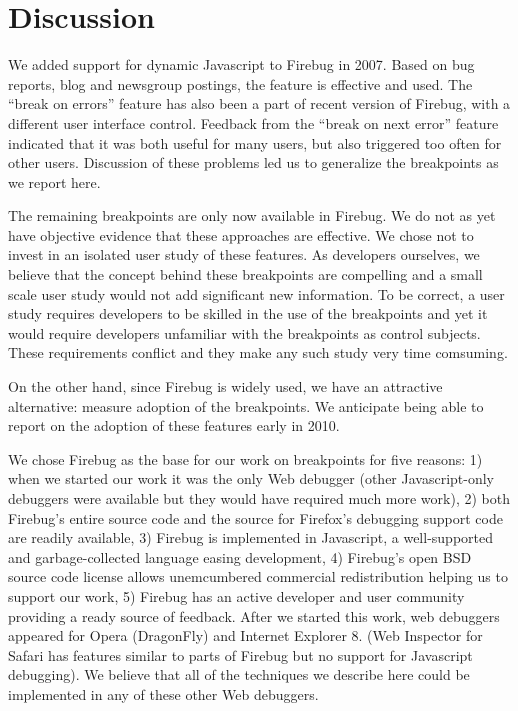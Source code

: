 \documentclass{www2010-accepted}
\begin{document}
\section{Discussion}

We added support for dynamic Javascript to Firebug in 2007.
Based on bug reports, blog and newsgroup postings, the feature
is effective and used. The ``break on errors'' feature has also been a part of
recent version of Firebug, with a different user interface control.
Feedback from the ``break on next error'' feature
indicated that it was both useful for many users,
but also triggered too often for other users. Discussion of these problems
led us to generalize the breakpoints as we report here.

The remaining breakpoints are only now available in Firebug. We do not as yet have
objective evidence that these approaches are effective.
We chose not to invest in an isolated user study of these features.
As developers ourselves, we believe that the concept behind these breakpoints are
compelling and a small scale user study would not add significant new information.
To be correct, a user study requires developers to be skilled in the
use of the breakpoints and yet it would require developers
unfamiliar with the breakpoints as control subjects. These requirements conflict and they make any
such study very time comsuming.

On the other hand, since Firebug is widely used, we have an attractive alternative:
measure adoption of the breakpoints. We anticipate being able to report on the adoption
of these features early in 2010.

We chose Firebug as the base for our work on breakpoints for five
reasons: 1) when we started our work it was the only Web debugger
(other Javascript-only debuggers were available but they would have
required much more work), 2) both Firebug's entire source code and the
source for Firefox's debugging support code are readily available, 3)
Firebug is implemented in Javascript, a well-supported and
garbage-collected language easing development, 4) Firebug's open BSD
source code license allows unemcumbered commercial redistribution
helping us to support our work, 5) Firebug has an active developer and
user community providing a ready source of feedback. After we started
this work, web debuggers appeared for Opera (DragonFly) and Internet
Explorer 8. (Web Inspector for Safari has features similar to parts of
Firebug but no support for Javascript debugging). We believe that all 
of the techniques we describe here could be implemented in any of 
these other Web debuggers.
\end{document}
